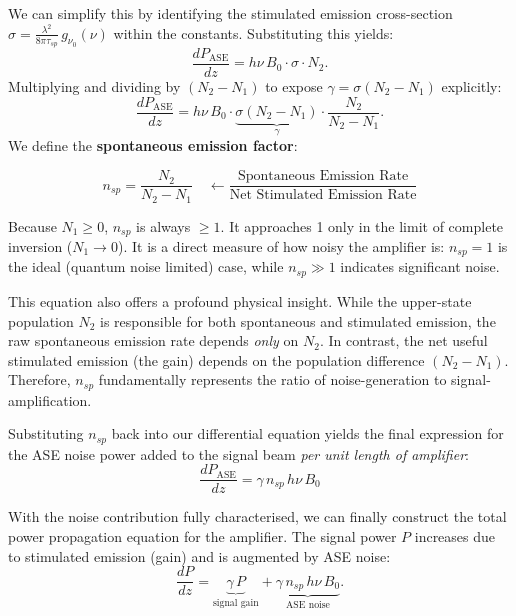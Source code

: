 We can simplify this by identifying the stimulated emission cross-section $\sigma = \frac{\lambda^2}{8\pi\tau_{sp}}\,g_{\nu_0}(\nu)$ within the constants. Substituting this yields:
\begin{equation*}
    \frac{dP_\text{ASE}}{dz}
    = h\nu\,B_0 \cdot \sigma \cdot N_2.
\end{equation*}
Multiplying and dividing by $(N_2 - N_1)$ to expose $\gamma = \sigma(N_2 - N_1)$ explicitly:
\begin{equation*}
    \frac{dP_\text{ASE}}{dz}
    = h\nu\,B_0 \cdot \underbrace{\sigma(N_2 - N_1)}_{\gamma}
    \cdot \frac{N_2}{N_2 - N_1}.
\end{equation*}
We define the \textbf{spontaneous emission factor}:
\begin{keyresult}
    \begin{equation}
        n_{sp} = \frac{N_2}{N_2 - N_1} \quad \longleftarrow \frac{\text{Spontaneous Emission Rate}}{\text{Net Stimulated Emission Rate}}
    \end{equation}
\end{keyresult}

Because $N_1 \geq 0$, $n_{sp}$ is always $\geq 1$. It approaches 1 only in the limit of complete inversion ($N_1 \to 0$). It is a direct measure of how noisy the amplifier is: $n_{sp} = 1$ is the ideal (quantum noise limited) case, while $n_{sp} \gg 1$ indicates significant noise.

This equation also offers a profound physical insight. While the upper-state population $N_2$ is responsible for both spontaneous and stimulated emission, the raw spontaneous emission rate depends \emph{only} on $N_2$. In contrast, the net useful stimulated emission (the gain) depends on the population difference $(N_2 - N_1)$. Therefore, $n_{sp}$ fundamentally represents the ratio of noise-generation to signal-amplification.

Substituting $n_{sp}$ back into our differential equation yields the final expression for the ASE noise power added to the signal beam \emph{per unit length of amplifier}:
\begin{equation*}
    \frac{dP_\text{ASE}}{dz} = \gamma\,n_{sp}\,h\nu\,B_0
\end{equation*}

With the noise contribution fully characterised, we can finally construct the total power propagation equation for the amplifier. The signal power $P$ increases due to stimulated emission (gain) and is augmented by ASE noise:
\begin{equation*}
    \frac{dP}{dz} = \underbrace{\gamma\,P}_{\text{signal gain}}
    + \underbrace{\gamma\,n_{sp}\,h\nu\,B_0}_{\text{ASE noise}}.
\end{equation*}

